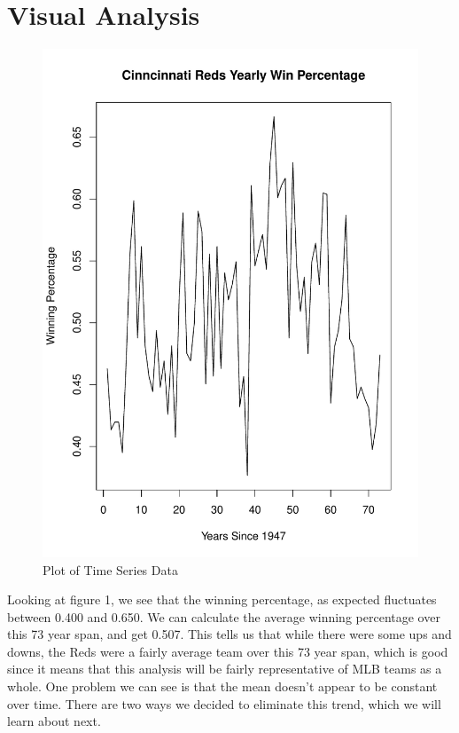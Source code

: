 \documentclass[12pt]{article}
\begin{document}
\section{Visual Analysis}\label{sec:chapter}
\begin{figure}[h!]
\centering
\includegraphics[scale=0.6]{Reds Win Pct.pdf}
\caption{Plot of Time Series Data}
\label{fig:Figure 1}
\end{figure} 
Looking at figure 1, we see that the winning percentage, as expected fluctuates between 0.400 and 0.650. We can calculate the average winning percentage over this 73 year span, and get 0.507. This tells us that while there were some ups and downs, the Reds were a fairly average team over this 73 year span, which is good since it means that this analysis will be fairly representative of MLB teams as a whole. One problem we can see is that the mean doesn't appear to be constant over time. There are two ways we decided to eliminate this trend, which we will learn about next. \\
\end{document}
